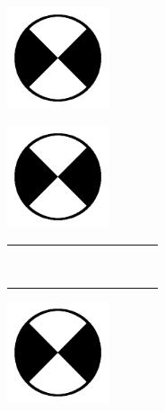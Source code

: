 \documentclass[a4paper, 12pt]{article}
\begin{document}
\newcommand{\magic}{1cm}

\begin{flushleft}
\includegraphics[width=3cm, height=3cm]{anchor.jpg} 
\end{flushleft}

\begin{flushright}
\includegraphics[width=3cm, height=3cm]{anchor.jpg}
\end{flushright}

\setlength\minrowclearance{\magic}

\newcommand{\cell}{}

\begin{center}
\begin{tabular}{|p{\magic}|p{\magic}|p{\magic}|p{\magic}|p{\magic}|p{\magic}|p{\magic}|p{\magic}|p{\magic}|p{\magic}|p{\magic}|p{\magic}|}
	\hline
	 \cell&\cell&\cell&\cell&\cell&\cell &\cell&\cell&\cell&\cell&\cell &\cell \\ \hline
	 \cell&\cell&\cell&\cell&\cell&\cell &\cell&\cell&\cell&\cell&\cell &\cell \\ \hline
	 \cell&\cell&\cell&\cell&\cell&\cell &\cell&\cell&\cell&\cell&\cell &\cell \\ \hline
	 \cell&\cell&\cell&\cell&\cell&\cell &\cell&\cell&\cell&\cell&\cell &\cell \\ \hline
	 \cell&\cell&\cell&\cell&\cell&\cell &\cell&\cell&\cell&\cell&\cell &\cell \\ \hline
	 \cell&\cell&\cell&\cell&\cell&\cell &\cell&\cell&\cell&\cell&\cell &\cell \\ \hline
	 \cell&\cell&\cell&\cell&\cell&\cell &\cell&\cell&\cell&\cell&\cell &\cell \\ \hline
	 \cell&\cell&\cell&\cell&\cell&\cell &\cell&\cell&\cell&\cell&\cell &\cell \\ \hline
	 \cell&\cell&\cell&\cell&\cell&\cell &\cell&\cell&\cell&\cell&\cell &\cell \\ \hline
	 \cell&\cell&\cell&\cell&\cell&\cell &\cell&\cell&\cell&\cell&\cell &\cell \\ \hline
\end{tabular}
\end{center}

\begin{flushleft}
\includegraphics[width=3cm, height=3cm]{anchor.jpg}
\end{flushleft}
\end{document}
